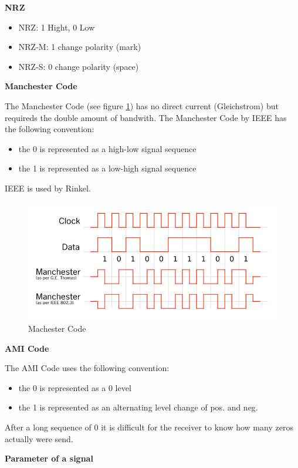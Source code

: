 \documentclass[11pt,twoside,twocolumn,landscape]{article}
\begin{document}
\textbf{NRZ}

\begin{itemize}
\item NRZ: 1 Hight, 0 Low
\item NRZ-M: 1 change polarity (mark)
\item NRZ-S: 0 change polarity (space)
\end{itemize}

\textbf{Manchester Code}

The Manchester Code (see figure \ref{fig:orge2a8afd}) has no direct current (Gleichstrom) but requireds the double amount of bandwith.
The Manchester Code by IEEE has the following convention:
\begin{itemize}
\item the 0 is represented as a high-low signal sequence
\item the 1 is represented as a low-high signal sequence
\end{itemize}


IEEE is used by Rinkel.


\begin{figure}[htbp]
\centering
\includegraphics[width=.9\linewidth]{img/manchester_code.png}
\caption{\label{fig:orge2a8afd}Machester Code}
\end{figure}

\textbf{AMI Code}

The AMI Code uses the following convention:
\begin{itemize}
\item the 0 is represented as a 0 level
\item the 1 is represented as an alternating level change of pos. and neg.
\end{itemize}


After a long sequence of 0 it is difficult for the receiver to know how many zeros actually were send.

\textbf{Parameter of a signal}
\end{document}
